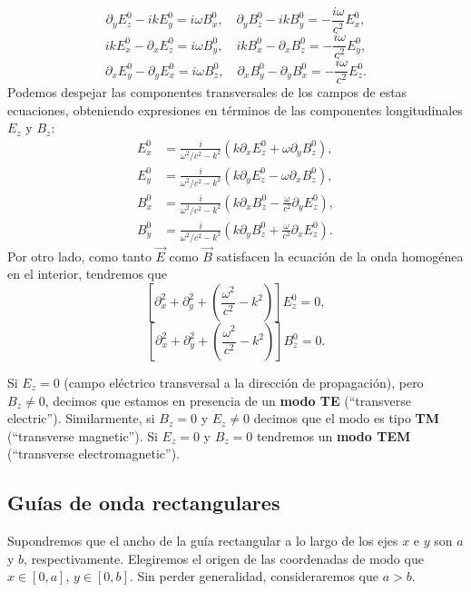 \begin{equation}
    \partial_y E^0_z - ik E^0_y = i\omega B^0_x, \quad
    \partial_y B^0_z - ik B^0_y = -\frac{i\omega}{c^2} E^0_x,
\end{equation}
\begin{equation}
    ik E^0_x - \partial_x E^0_z = i\omega B^0_y, \quad
    ik B^0_x - \partial_x B^0_z = -\frac{i\omega}{c^2} E^0_y,
\end{equation}
\begin{equation}
    \partial_x E^0_y - \partial_y E^0_x = i\omega B^0_z, \quad
    \partial_x B^0_y - \partial_y B^0_x = -\frac{i\omega}{c^2} E^0_z.
\end{equation}
Podemos despejar las componentes transversales de los campos de estas ecuaciones, obteniendo expresiones en términos de las componentes longitudinales $E_z$ y $B_z$:
\begin{align}
    E^0_x &= \frac{i}{\omega^2/c^2 - k^2} \left( k \partial_x E^0_z + \omega \partial_y B^0_z \right), \label{ExGO}\\
    E^0_y &= \frac{i}{\omega^2/c^2 - k^2} \left( k \partial_y E^0_z - \omega \partial_x B^0_z \right), \label{EyGO}\\
    B^0_x &= \frac{i}{\omega^2/c^2 - k^2} \left( k \partial_x B^0_z - \frac{\omega}{c^2} \partial_y E^0_z \right), \label{BxGO}\\
    B^0_y &= \frac{i}{\omega^2/c^2 - k^2} \left( k \partial_y B^0_z + \frac{\omega}{c^2} \partial_x E^0_z \right). \label{ByGO}
\end{align}
Por otro lado, como tanto $\vec{E}$ como $\vec{B}$ satisfacen la ecuación de la onda homogénea en el interior, tendremos que
\begin{equation}
\left[ \partial^2_x + \partial^2_y + \left( \frac{\omega^2}{c^2} - k^2 \right) \right] E^0_z = 0,
\end{equation}
\begin{equation}\label{EOBzGO}
\left[ \partial^2_x + \partial^2_y + \left( \frac{\omega^2}{c^2} - k^2 \right) \right] B^0_z = 0.
\end{equation}

Si $E_z=0$ (campo eléctrico transversal a la dirección de propagación), pero $B_z\neq 0$, decimos que estamos en presencia de un \textbf{modo TE} (``transverse electric''). Similarmente, si $B_z=0$ y $E_z\neq 0$ decimos que el modo es tipo \textbf{TM} (``transverse magnetic''). Si $E_z=0$ y $B_z= 0$ tendremos un \textbf{modo TEM} (``transverse electromagnetic''). 


\subsection{Guías de onda rectangulares}
Supondremos que el ancho de la guía rectangular a lo largo de los ejes $x$ e $y$ son $a$ y $b$, respectivamente. Elegiremos el origen de las coordenadas de modo que $x\in [0,a]$, $y\in [0,b]$. Sin perder generalidad, consideraremos que $a>b$.

